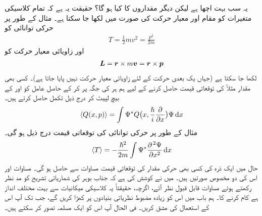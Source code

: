 یہ سب بہت اچھا ہے  لیکن دیگر مقداروں کا کیا ہو گا؟ حقیقت یہ ہے کہ تمام کلاسیکی متغیرات کو مقام اور معیار حرکت کی صورت میں لکھا جا سکتا ہے۔ مثال کے طور پر حرکی توانائی کو
\begin{align*}
T=\frac{1}{2}mv^{2}=\frac{p^{2}}{2m}
\end{align*}
اور زاویائی معیار حرکت کو 
\begin{align*}
{\ensuremath{{\boldsymbol{L}}}}={{\boldsymbol{r}}}\times m{{\boldsymbol{v}}}={{\boldsymbol{r}}}\times {\ensuremath{{\boldsymbol{p}}}}
\end{align*}
لکھا جا سکتا ہے (جہاں یک بعدی حرکت کے لئے  زاویائی معیار حرکت نہیں پایا جاتا ہے)۔ کسی بھی مقدار مثلاً  کی توقعاتی قیمت  حاصل کرنے کے لیے ہم ہر   کی جگہ  پر کر کے حاصل عامل کو  اور  کے بیچ لپیٹ کر درج ذیل تکمل حاصل کرتے ہیں۔
\begin{align}\label{مساوات_تفاعل_موج_توقعاتی_قیمت_حصول}
\langle Q(x,p) \rangle=\int \Psi^*Q\big (x,\frac{\hslash}{i}\frac{\partial}{\partial{x}}\big )\Psi \dif{x}
\end{align}
مثال کے طور پر حرکی توانائی کی توقعاتی قیمت درج ذیل ہو گی۔
\begin{align}
\langle T \rangle=-\frac{\hslash ^{2}}{2m}\int \Psi^*\frac{\partial^{\,2}\Psi}{\partial{x^{2}}}\dif{x}
\end{align}
حال  میں ایک ذرہ کی کسی بھی حرکی مقدار کی توقعاتی قیمت  مساوات   سے حاصل ہو گی۔
مساوات  اور   اس کی دو مخصوص صورتیں ہیں۔ میں نے کوشش کی ہے کہ جناب بوہر کی شماریاتی تشریح کو مد نظر رکھتے ہوئے   مساوات   قابل قبول نظر آئے، اگرچہ، حقیقتاً یہ کلاسیکی میکانیات سے بہت مختلف انداز ہے کام کرنے کا۔ ہم باب  میں اس کو زیادہ مضبوط نظریاتی بنیادوں پر کھڑا کریں گے، جب تک آپ اس کے استعمال  کی مشق کریں۔ فی الحال آپ اس کو ایک مسلمہ تصور کر سکتے ہیں۔

